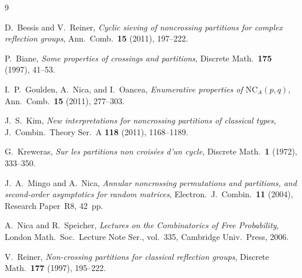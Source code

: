 \documentclass[11pt,a4paper]{article}
\theoremstyle{definition}
\theoremstyle{remark}
\newcommand{\NCA}{\mathrm{NC}_A}
\begin{document}
\begin{thebibliography}{9}

D.~Bessis and V.~Reiner,
\emph{Cyclic sieving of noncrossing partitions for complex reflection groups},
Ann.\ Comb.\ \textbf{15} (2011), 197--222.

P.~Biane,
\emph{Some properties of crossings and partitions},
Discrete Math.\ \textbf{175} (1997), 41--53.

I.~P.~Goulden, A.~Nica, and I.~Oancea,
\emph{Enumerative properties of $\NCA(p,q)$},
Ann.\ Comb.\ \textbf{15} (2011), 277--303.

J.~S.~Kim,
\emph{New interpretations for noncrossing partitions of classical types},
J.~Combin.\ Theory Ser.~A \textbf{118} (2011), 1168--1189.

G.~Kreweras,
\emph{Sur les partitions non crois\'ees d'un cycle},
Discrete Math.\ \textbf{1} (1972), 333--350.

J.~A.~Mingo and A.~Nica,
\emph{Annular noncrossing permutations and partitions, and second-order asymptotics for random matrices},
Electron.\ J.~Combin.\ \textbf{11} (2004), Research Paper~R8, 42~pp.

A.~Nica and R.~Speicher,
\emph{Lectures on the Combinatorics of Free Probability},
London Math.\ Soc.\ Lecture Note Ser., vol.~335, Cambridge Univ.\ Press, 2006.

V.~Reiner,
\emph{Non-crossing partitions for classical reflection groups},
Discrete Math.\ \textbf{177} (1997), 195--222.

\end{thebibliography}
\end{document}
